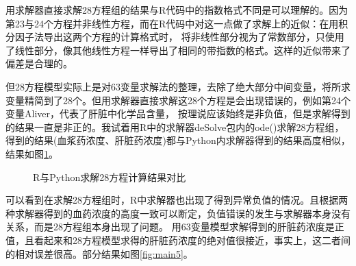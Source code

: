 \documentclass{article}
\begin{document}
用求解器直接求解28方程组的结果与R代码中的指数格式不同是可以理解的。因为第23与24个方程并非线性方程，而在R代码中对这一点做了求解上的近似：在用积分因子法导出这两个方程的计算格式时，
将非线性部分视为了常数部分，只使用了线性部分，像其他线性方程一样导出了相同的带指数的格式。这样的近似带来了偏差是合理的。

但28方程模型实际上是对63变量求解法的整理，去除了绝大部分中间变量，将所求变量精简到了28个。但用求解器直接求解这28个方程是会出现错误的，例如第24个变量Aliver，代表了肝脏中化学品含量，
按理说应该始终是非负值，但是求解得到的结果一直是非正的。我试着用R中的求解器deSolve包内的ode()求解28方程组，得到的结果(血浆药浓度、肝脏药浓度)都与Python内求解器得到的结果高度相似，结果如图\ref{fig:main4}。

\begin{figure}
  \centering
  \caption{R与Python求解28方程计算结果对比}
  \label{fig:main4}
\end{figure}

可以看到在求解28方程组时，R中求解器也出现了得到异常负值的情况。且根据两种求解器得到的血药浓度的高度一致可以断定，负值错误的发生与求解器本身没有关系，而是28方程组本身出现了问题。
用63变量模型求解得到的肝脏药浓度是正值，且看起来和28方程模型求得的肝脏药浓度的绝对值很接近，事实上，这二者间的相对误差很高。部分结果如图\ref{fig:main5}。
\end{document}
